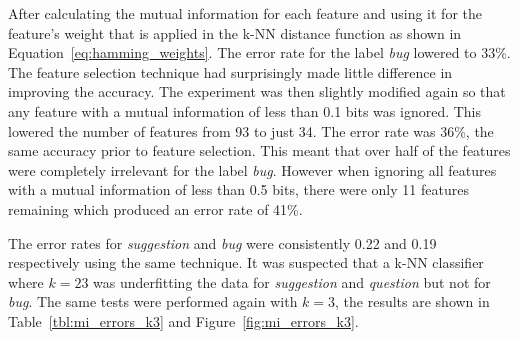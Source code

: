 After calculating the mutual information for each feature and using it for the feature's weight that is applied in the k-NN
distance function as shown in Equation~\ref{eq:hamming_weights}. The error rate for the label \textit{bug} lowered to 33\%. The
feature selection technique had surprisingly made little difference in improving the accuracy. The experiment was then slightly
modified again so that any feature with a mutual information of less than 0.1 bits was ignored. This lowered the number of
features from 93 to just 34. The error rate was 36\%, the same accuracy prior to feature selection. This meant that over half of
the features were completely irrelevant for the label \textit{bug}. However when ignoring all features with a mutual information
of less than 0.5 bits, there were only 11 features remaining which produced an error rate of 41\%.

The error rates for \textit{suggestion} and \textit{bug} were consistently 0.22 and 0.19 respectively using the same technique.
It was suspected that a k-NN classifier where $k = 23$ was underfitting the data for \textit{suggestion} and \textit{question}
but not for \textit{bug}. The same tests were performed again with $k = 3$, the results are shown in
Table~\ref{tbl:mi_errors_k3} and Figure~\ref{fig:mi_errors_k3}.


